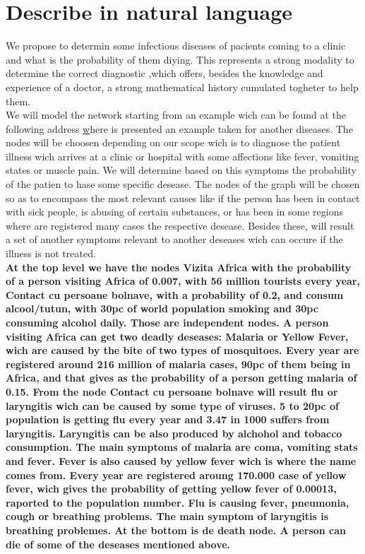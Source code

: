\section{Describe in natural language}

\tab We propose to determin some infectious diseases of pacients coming to a clinic and what is the probability of them diying. This represents a strong modality to determine the correct diagnostic ,which offers, besides the knowledge and experience of a doctor, a strong mathematical history cumulated togheter to help them.\\

\tab We will model the network starting from an example wich can be found at the following address \href{https://www.norsys.com/tutorials/netica/secA/tut_A1.html}where is presented an example taken for another diseases. The nodes will be choosen depending on our scope wich is to diagnose the patient illness wich arrives at a clinic or hospital with some affections like fever, vomiting states or muscle pain. We will determine based on this symptoms the probability of the patien to hase some specific desease. The nodes of the graph will be chosen so as to encompass the most relevant causes like if the person has been in contact with sick people, is abusing of certain substances, or has been in some regions where are registered many cases the respective desease. Besides these, will result a set of another symptoms relevant to another deseases wich can occure if the illness is not treated. \\

\tab \textbf{At the top level we have the nodes Vizita Africa with the probability of a person visiting Africa of 0.007, with 56 million tourists every year, Contact cu persoane bolnave, with a probability of 0.2, and  consum alcool/tutun, with 30pc of world population smoking and 30pc consuming alcohol daily. Those are independent nodes. A person visiting Africa can get two deadly deseases: Malaria or Yellow Fever, wich are caused by the bite of two types of mosquitoes. Every year are registered around 216 million of malaria cases, 90pc of them being in Africa, and that gives as the probability of a person getting malaria of 0.15. From the node Contact cu persoane bolnave will result flu or laryngitis wich can be caused by some type of viruses. 5 to 20pc of population is getting flu every year and 3.47 in 1000 suffers from laryngitis. Laryngitis can be also produced by alchohol and tobacco consumption. The main symptoms of malaria are coma, vomiting stats and fever. Fever is also caused by yellow fever wich is where the name comes from. Every year are registered aroung 170.000 case of yellow fever, wich gives the probability of getting yellow fever of 0.00013, raported to the population number. Flu is causing fever, pneumonia, cough or breathing problems. The main symptom of laryngitis is breathing problemes. At the bottom is de death node. A person can die of some of the deseases mentioned above.}\\


